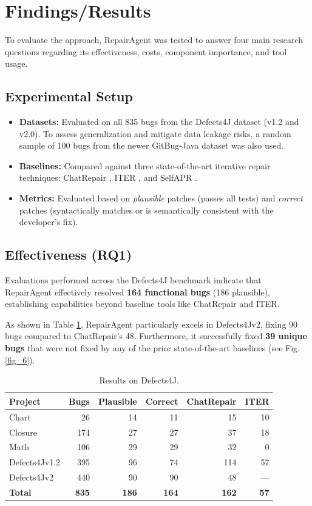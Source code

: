 \documentclass[manuscript,review]{acmart}
\begin{document}
\section{Findings/Results}
To evaluate the approach, RepairAgent was tested to answer four main research questions regarding its effectiveness, costs, component importance, and tool usage. 

\subsection{Experimental Setup}
\begin{itemize}
    \item \textbf{Datasets:} Evaluated on all 835 bugs from the Defects4J \cite{just2014defects4j} dataset (v1.2 and v2.0). To assess generalization and mitigate data leakage risks, a random sample of 100 bugs from the newer GitBug-Java \cite{silva2024gitbug} dataset was also used.
    \item \textbf{Baselines:} Compared against three state-of-the-art iterative repair techniques: ChatRepair \cite{xia2023keep}, ITER \cite{ye2024iter}, and SelfAPR \cite{ye2022selfapr}.
    \item \textbf{Metrics:} Evaluated based on \textit{plausible} patches (passes all tests) and \textit{correct} patches (syntactically matches or is semantically consistent with the developer's fix).
\end{itemize}

\subsection{Effectiveness (RQ1)}
Evaluations performed across the Defects4J benchmark indicate that RepairAgent effectively resolved \textbf{164 functional bugs} (186 plausible), establishing capabilities beyond baseline tools like ChatRepair and ITER. 

As shown in Table \ref{tab:defects4j_results}, RepairAgent particularly excels in Defects4Jv2, fixing 90 bugs compared to ChatRepair's 48. Furthermore, it successfully fixed \textbf{39 unique bugs} that were not fixed by any of the prior state-of-the-art baselines (see Fig. \ref{fig_6}). 

\begin{table}[htbp]
\caption{Results on Defects4J.}
\label{tab:defects4j_results}
\centering
\small
\begin{tabular}{lrrrrr}
\toprule
\textbf{Project} & \textbf{Bugs} & \textbf{Plausible} & \textbf{Correct} & \textbf{ChatRepair} & \textbf{ITER} \\
\midrule
Chart & 26 & 14 & 11 & 15 & 10 \\
Closure & 174 & 27 & 27 & 37 & 18 \\
Math & 106 & 29 & 29 & 32 & 0 \\
Defects4Jv1.2 & 395 & 96 & 74 & 114 & 57 \\
Defects4Jv2 & 440 & 90 & 90 & 48 & --- \\
\midrule
\textbf{Total} & \textbf{835} & \textbf{186} & \textbf{164} & \textbf{162} & \textbf{57} \\
\bottomrule
\end{tabular}
\end{table}
\end{document}
